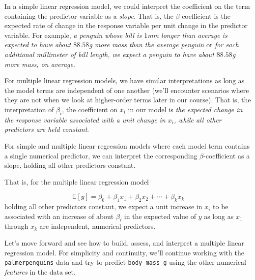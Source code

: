 \documentclass[
  letterpaper,
  DIV=11,
  numbers=noendperiod]{scrartcl}
\begin{document}
In a simple linear regression model, we could interpret the coefficient
on the term containing the predictor variable as a \emph{slope}. That
is, the \(\beta\) coefficient is the expected rate of change in the
response variable per unit change in the predictor variable. For
example, \emph{a penguin whose bill is \(1\)mm longer than average is
expected to have about \(88.58\)g more mass than the average penguin} or
\emph{for each additional millimeter of bill length, we expect a penguin
to have about \(88.58\)g more mass, on average}.

For multiple linear regression models, we have similar interpretations
as long as the model terms are independent of one another (we'll
encounter scenarios where they are not when we look at higher-order
terms later in our course). That is, the interpretation of \(\beta_i\),
the coefficient on \(x_i\) in our model is \emph{the expected change in
the response variable associated with a unit change in \(x_i\), while
all other predictors are held constant}.

\begin{tcolorbox}[enhanced jigsaw, rightrule=.15mm, breakable, bottomrule=.15mm, opacitybacktitle=0.6, colback=white, leftrule=.75mm, bottomtitle=1mm, colbacktitle=quarto-callout-tip-color!10!white, coltitle=black, colframe=quarto-callout-tip-color-frame, opacityback=0, arc=.35mm, toptitle=1mm, titlerule=0mm, title=\textcolor{quarto-callout-tip-color}{\faLightbulb}\hspace{0.5em}{Model Coefficients as Slopes}, toprule=.15mm, left=2mm]

For simple and multiple linear regression models where each model term
contains a single numerical predictor, we can interpret the
corresponding \(\beta\)-coefficient as a slope, holding all other
predictors constant.

That is, for the multiple linear regression model

\[\mathbb{E}\left[y\right] = \beta_0 + \beta_1 x_1 + \beta_2 x_2 + \cdots + \beta_k x_k\]
holding all other predictors constant, we expect a unit increase in
\(x_i\) to be associated with an increase of about \(\beta_i\) in the
expected value of \(y\) as long as \(x_1\) through \(x_k\) are
independent, numerical predictors.

\end{tcolorbox}

Let's move forward and see how to build, assess, and interpret a
multiple linear regression model. For simplicity and continuity, we'll
continue working with the \texttt{palmerpenguins} data and try to
predict \texttt{body\_mass\_g} using the other numerical \emph{features}
in the data set.
\end{document}
